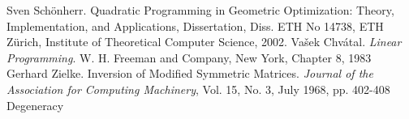 \documentclass[a4paper]{article}
\begin{document}
\begin{thebibliography}{99}
 Sven Sch\"{o}nherr. Quadratic Programming in Geometric Optimization:
Theory, Implementation, and Applications, Dissertation, Diss. ETH No 14738, ETH
Z\"{u}rich, Institute of Theoretical Computer Science, 2002.
 Va\v{s}ek Chv\'{a}tal. \textit{Linear Programming}. W. H. Freeman and Company,
New York, Chapter 8, 1983 
 Gerhard Zielke. Inversion of Modified Symmetric Matrices. 
\textit{Journal of the Association for Computing Machinery}, Vol. 15, No. 3,
July 1968, pp. 402-408
 Degeneracy
\end{thebibliography}
\end{document}
